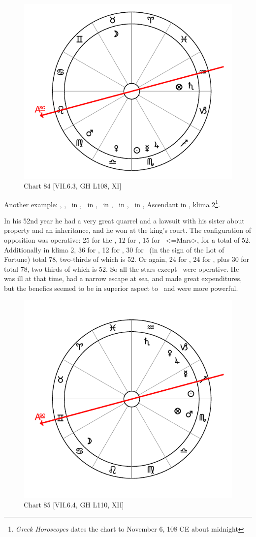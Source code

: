 \newpage
\begin{figure}
\centering
\vspace{0pt}
\includegraphics[width=.68\textwidth]{charts/7_6_03}
\caption{Chart 84 [VII.6.3, GH L108, XI]}
\label{fig:chart84}
\end{figure} 

Another example: \Sun, \Mercury, \Jupiter\, in \Scorpio, \Moon\, in \Taurus, \Saturn\, in \Aquarius, \Mars\, in \Virgo, \Venus\, in \Libra, Ascendant in \Leo, klima 2\footnote{\textit{Greek Horoscopes} dates the chart to November 6, 108 CE about midnight}.

In his 52nd year he had a very great quarrel and a lawsuit with his sister about property and an inheritance, and he won at the king’s court. The configuration of opposition was operative: 25 for the \Moon, 12 for \Jupiter, 15 for \Scorpio\, <=Mars>, for a
total of 52. Additionally in klima 2, 36 for \Scorpio, 12 for \Jupiter, 30 for \Saturn\, (in the sign of the Lot of Fortune) total 78, two-thirds of which is 52. Or again, 24 for \Taurus, 24 for \Aquarius, plus 30 for \Saturn total 78, two-thirds of which is 52. So all the stars except \Mars\, were operative. He was ill at that time, had a narrow escape at sea, and made great expenditures, but the benefics seemed to be in superior aspect to \Saturn\, and were more powerful.

\newpage 
\begin{figure}
\centering
\vspace{0pt}
\includegraphics[width=.68\textwidth]{charts/7_6_04}
\caption{Chart 85 [VII.6.4, GH L110, XII]}
\label{fig:chart85}
\end{figure} 

